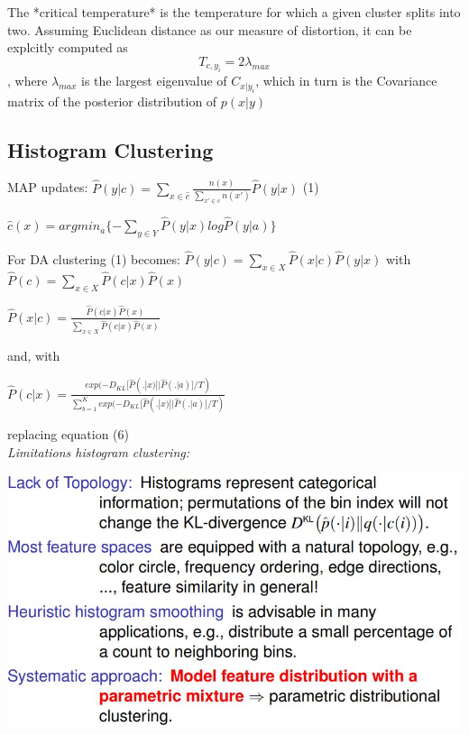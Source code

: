 \documentclass[9pt,parskip]{scrartcl}
\begin{document}
\begin{multicols*}{4}
The *critical temperature* is the temperature for which a given cluster splits into two. Assuming Euclidean distance as our measure of distortion, it can be explcitly computed as $$T_{c,y_i} = 2\lambda_{max}$$, where $\lambda_{max}$ is the largest eigenvalue of $C_{x|y_i}$, which in turn is the Covariance matrix of the posterior distribution of $p(x|y)$
\subsection*{Histogram Clustering}
MAP updates:
$\hat{P}(y|c) = \sum_{x \in \hat{c}}{\frac{n(x)}{\sum_{x' \in c}n(x')}\hat{P}(y|x)} $  (1)

$\hat{c}(x) = argmin_{a}\{-\sum_{y\in Y}{\hat{P}(y|x)log\hat{P}(y|a)}\}$  

For DA clustering (1) becomes:
$\hat{P}(y|c)=\sum_{x \in X}\hat{P}(x|c) \hat{P}(y|x)$
with
$\hat{P}(c) = \sum_{x \in X}\hat{P}(c|x)\hat{P}(x)$

$\hat{P}(x|c) = \frac{\hat{P}(c|x)\hat{P}(x)}{\sum_{x \in X}\hat{P}(c|x)\hat{P}(x)}$

and, with

$\hat{P}(c|x) = \frac{exp(-D_{KL}[\hat{P}(.|x)||\hat{P}(.|a)]/T)}{\sum_{b=1}^{K}exp(-D_{KL}[\hat{P}(.|x)||\hat{P}(.|a)]/T)}$ 

replacing equation (6)\\
\textit{Limitations histogram clustering:}
\begin{center}
\includegraphics[width=0.8\linewidth]{pictures/limitationsHC.jpg}
\end{center}


\end{multicols*}
\end{document}
